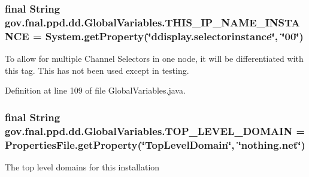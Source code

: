 \hypertarget{classgov_1_1fnal_1_1ppd_1_1dd_1_1GlobalVariables_ae5fe9c75fedaa742e5f68baad8768d7f}{
\subsubsection[{T\-H\-I\-S\-\_\-\-I\-P\-\_\-\-N\-A\-M\-E\-\_\-\-I\-N\-S\-T\-A\-N\-C\-E}]{\setlength{\rightskip}{0pt plus 5cm}final String gov.\-fnal.\-ppd.\-dd.\-Global\-Variables.\-T\-H\-I\-S\-\_\-\-I\-P\-\_\-\-N\-A\-M\-E\-\_\-\-I\-N\-S\-T\-A\-N\-C\-E = System.\-get\-Property(\char`\"{}ddisplay.\-selectorinstance\char`\"{}, \char`\"{}00\char`\"{})\hspace{0.3cm}{\ttfamily [static]}}}\label{classgov_1_1fnal_1_1ppd_1_1dd_1_1GlobalVariables_ae5fe9c75fedaa742e5f68baad8768d7f}
To allow for multiple Channel Selectors in one node, it will be differentiated with this tag. This has not been used except in testing. 

Definition at line 109 of file Global\-Variables.\-java.

\hypertarget{classgov_1_1fnal_1_1ppd_1_1dd_1_1GlobalVariables_ad0a782cf8410f087e2bacb776ff69ca1}{
\subsubsection[{T\-O\-P\-\_\-\-L\-E\-V\-E\-L\-\_\-\-D\-O\-M\-A\-I\-N}]{\setlength{\rightskip}{0pt plus 5cm}final String gov.\-fnal.\-ppd.\-dd.\-Global\-Variables.\-T\-O\-P\-\_\-\-L\-E\-V\-E\-L\-\_\-\-D\-O\-M\-A\-I\-N = {\bf Properties\-File.\-get\-Property}(\char`\"{}Top\-Level\-Domain\char`\"{}, \char`\"{}nothing.\-net\char`\"{})\hspace{0.3cm}{\ttfamily [static]}}}\label{classgov_1_1fnal_1_1ppd_1_1dd_1_1GlobalVariables_ad0a782cf8410f087e2bacb776ff69ca1}
The top level domains for this installation 

